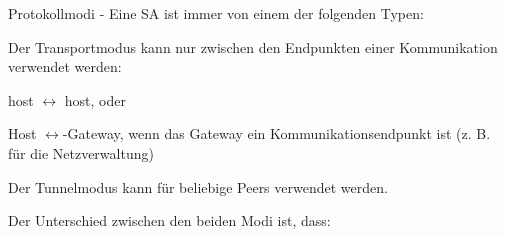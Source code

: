 \documentclass[a4paper]{article}
\begin{document}
\begin{multicols}{3}
\begin{itemize*}
\begin{itemize*}
\begin{itemize*}
                  \end{itemize*}
            \end{itemize*}
            \item Protokollmodi - Eine SA ist immer von einem der folgenden Typen:
            \begin{itemize*}
                  \item Der Transportmodus kann nur zwischen den Endpunkten einer Kommunikation verwendet werden:
                  \begin{itemize*}
                        \item host $\leftrightarrow$ host, oder
                        \item Host $\leftrightarrow$-Gateway, wenn das Gateway ein Kommunikationsendpunkt ist (z. B. für die Netzverwaltung)
                  \end{itemize*}
                  \item Der Tunnelmodus kann für beliebige Peers verwendet werden.
            \end{itemize*}
      \end{itemize*}

      Der Unterschied zwischen den beiden Modi ist, dass:


\end{multicols}
\end{document}
